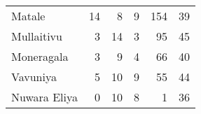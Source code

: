 \begin{tabular}{lrrrrr}
Matale       &          14 &           8 &            9 &              154 &          39 \\
Mullaitivu   &           3 &          14 &            3 &               95 &          45 \\
Moneragala   &           3 &           9 &            4 &               66 &          40 \\
Vavuniya     &           5 &          10 &            9 &               55 &          44 \\
Nuwara Eliya &           0 &          10 &            8 &                1 &          36 \\
\bottomrule
\end{tabular}
